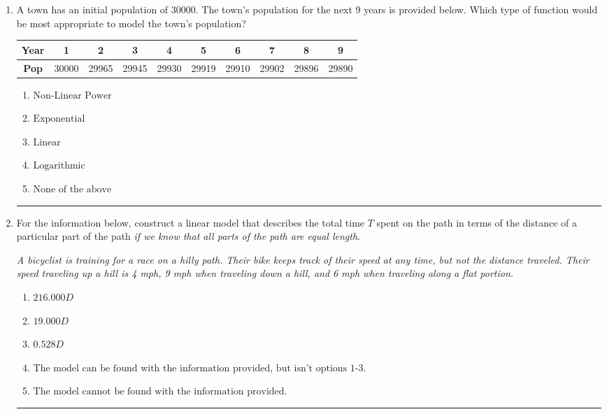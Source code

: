 \documentclass[14pt]{extbook}
\newcommand{\litem}[1]{\item#1\hspace*{-1cm}\rule{\textwidth}{0.4pt}}
\begin{document}
\begin{enumerate}
{\begin{enumerate}[label=\Alph*.]
\end{enumerate} }
\litem{
A town has an initial population of 30000. The town's population for the next 9 years is provided below. Which type of function would be most appropriate to model the town's population?

\begin{tabular}{c|c|c|c|c|c|c|c|c|c}
\textbf{Year} &1 &2 &3 &4 &5 &6 &7 &8 &9\tabularnewline \hline
\textbf{Pop} &30000 &29965 &29945 &29930 &29919 &29910 &29902 &29896 &29890\end{tabular}\begin{enumerate}[label=\Alph*.]
\item \( \text{Non-Linear Power} \)
\item \( \text{Exponential} \)
\item \( \text{Linear} \)
\item \( \text{Logarithmic} \)
\item \( \text{None of the above} \)

\end{enumerate} }
\litem{
For the information below, construct a linear model that describes the total time $T$ spent on the path in terms of the distance of a particular part of the path \textit{if we know that all parts of the path are equal length}.
\begin{center}
    \textit{ A bicyclist is training for a race on a hilly path. Their bike keeps track of their speed at any time, but not the distance traveled. Their speed traveling up a hill is 4 mph, 9 mph when traveling down a hill, and 6 mph when traveling along a flat portion. }
\end{center}
\begin{enumerate}[label=\Alph*.]
\item \( 216.000 D \)
\item \( 19.000 D \)
\item \( 0.528 D \)
\item \( \text{The model can be found with the information provided, but isn't options 1-3.} \)
\item \( \text{The model cannot be found with the information provided.} \)

\end{enumerate} }
\end{enumerate}
\end{document}
